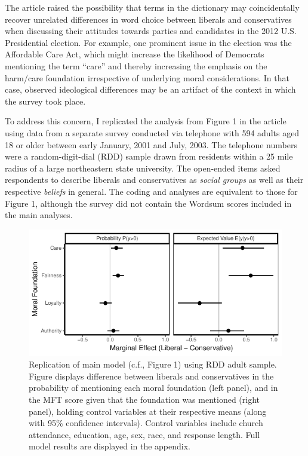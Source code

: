 \documentclass[12pt]{article}
\begin{document}
The article raised the possibility that terms in the dictionary may coincidentally recover unrelated differences in word choice between liberals and conservatives when discussing their attitudes towards parties and candidates in the 2012 U.S. Presidential election. For example, one prominent issue in the election was the Affordable Care Act, which might increase the likelihood of Democrats mentioning the term ``care'' and thereby increasing the emphasis on the harm/care foundation irrespective of underlying moral considerations. In that case, observed ideological differences may be an artifact of the context in which the survey took place.

To address this concern, I replicated the analysis from Figure 1 in the article using data from a separate survey conducted via telephone with 594 adults aged 18 or older between early January, 2001 and July, 2003. The telephone numbers were a random-digit-dial (RDD) sample drawn from residents within a 25 mile radius of a large northeastern state university. The open-ended items asked respondents to describe liberals and conservatives as \textit{social groups} as well as their respective \textit{beliefs} in general. The coding and analyses are equivalent to those for Figure 1, although the survey did not contain the Wordsum scores included in the main analyses.

\begin{figure}[ht]\centering
\includegraphics{../calc/fig/tobit_ideol_lisurvey.pdf}
\caption{Replication of main model (c.f., Figure 1) using RDD adult sample. Figure displays difference between liberals and conservatives in the probability of mentioning each moral foundation (left panel), and in the MFT score given that the foundation was mentioned (right panel), holding control variables at their respective means (along with 95\% confidence intervals). Control variables include church attendance, education, age, sex, race, and response length. Full model results are displayed in the appendix.
}\label{fig:tobit_ideol_lisurvey}
\end{figure}
\end{document}
